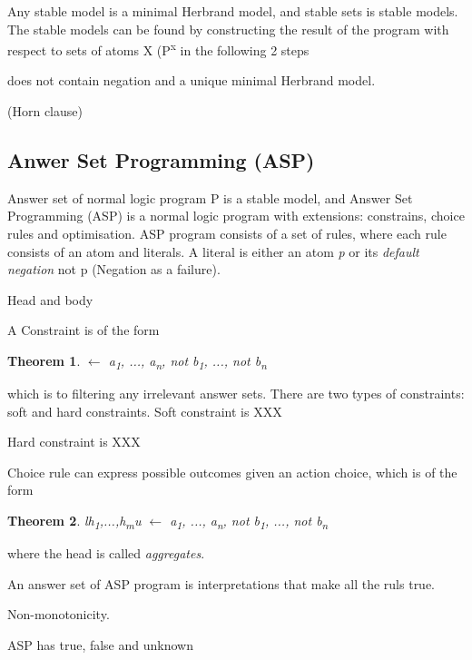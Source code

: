 \documentclass[12pt,twoside]{report}
\newtheorem{theorem}{Theorem}
\begin{document}
Any stable model is a minimal Herbrand model, and stable sets is stable models. The stable models can be found by constructing the result of the program with respect to sets of atoms X (P\textsuperscript{x} in the following 2 steps



does not contain negation and a unique minimal Herbrand model.

\begin{examp} (Horn clause)

\end{examp}


\subsection{Anwer Set Programming (ASP)}

Answer set of normal logic program P is a stable model, and Answer Set Programming (ASP) is a normal logic program with extensions: constrains, choice rules and optimisation. ASP program consists of a set of rules, where each rule consists of an atom and literals.
A literal is either an atom \textit{p} or its \textit{default negation} not p (Negation as a failure).


Head and body

A Constraint is of the form

\begin{theorem}
$\leftarrow$ a\textsubscript{1}, ..., a\textsubscript{n}, not b\textsubscript{1}, ..., not b\textsubscript{n}
\end{theorem}

which is to filtering any irrelevant answer sets.
There are two types of constraints: soft and hard constraints. Soft constraint is XXX

Hard constraint is XXX

Choice rule can express possible outcomes given an action choice, which is of the form

\begin{theorem}
l{h\textsubscript{1},...,h\textsubscript{m}}u $\leftarrow$ a\textsubscript{1}, ..., a\textsubscript{n}, not b\textsubscript{1}, ..., not b\textsubscript{n}
\end{theorem}

where the head is called \textit{aggregates}.

An answer set of ASP program is interpretations that make all the ruls true.

Non-monotonicity.

ASP has true, false and unknown
\end{document}
